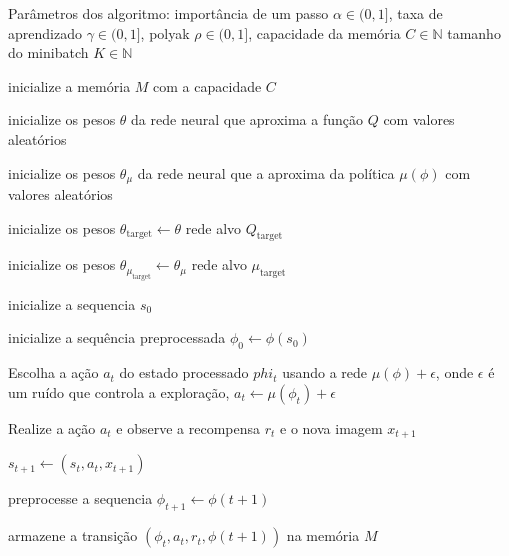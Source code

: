 \begin{algorithm}[H]
    Parâmetros dos algoritmo:
    importância de um passo $\alpha \in (0,1]$,
    taxa de aprendizado $\gamma \in (0,1]$,
    polyak $\rho \in (0,1]$,
    capacidade da memória $C \in \mathbb{N}$
    tamanho do minibatch $K \in \mathbb{N}$ 


    inicialize a memória $M$ com a capacidade $C$

    inicialize os pesos $\theta$ da rede neural que aproxima a função $Q$ com valores aleatórios

    inicialize os pesos $\theta_\mu$ da rede neural que a aproxima da política $\mu(\phi)$ com valores aleatórios

    inicialize os pesos $\theta_{\text{target}}  \leftarrow \theta$ rede alvo $Q_{\text{target}}$

    inicialize os pesos $\theta_{\mu_{\text{target}}}  \leftarrow \theta_\mu$ rede alvo $\mu_{\text{target}}$


     {
        inicialize a sequencia $s_0$

        inicialize a sequência preprocessada $\phi_0 \leftarrow \phi(s_0)$ 
        

         {
            Escolha a ação $a_t$ do estado processado $phi_t$ usando a rede  $\mu(\phi) + \epsilon$, onde
            $\epsilon$ é um ruído que controla a exploração, $a_t \leftarrow \mu(\phi_t)  + \epsilon$ 

            Realize a ação $a_t$ e observe a recompensa $r_t$ e o nova imagem $x_{t+1}$
            
            $s_{t+1}  \leftarrow (s_t, a_t, x_{t+1})$   

            preprocesse a sequencia $\phi_{t+1} \leftarrow \phi(t+1)$
            
            armazene a transição $(\phi_t,a_t,r_t,\phi(t+1))$ na memória $M$

            }}
\end{algorithm}
